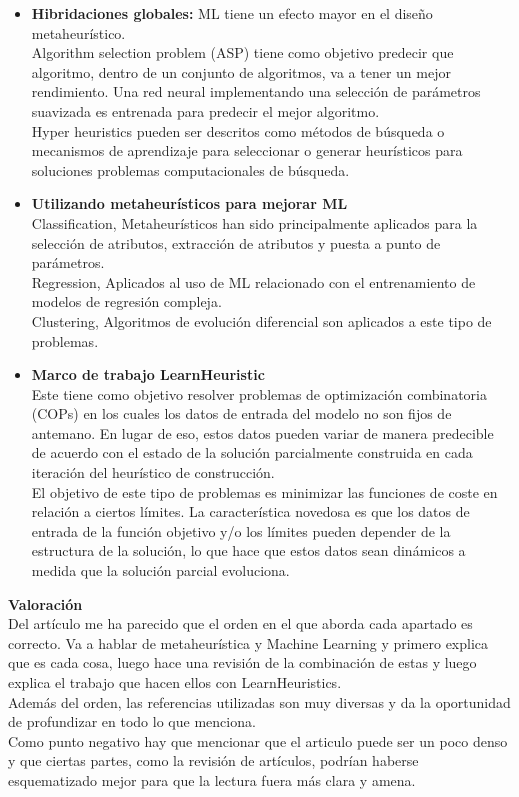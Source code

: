 \documentclass[11pt]{article} %
\begin{document}
\begin{itemize}
\item \textbf{Hibridaciones globales:} ML tiene un efecto mayor en el diseño metaheurístico.\\[0.2cm]
Algorithm selection problem (ASP)  tiene como objetivo predecir que algoritmo, dentro de un conjunto de algoritmos, va a tener un mejor rendimiento. Una red neural implementando una selección de parámetros suavizada es entrenada para predecir el mejor algoritmo.\\[0.2cm]
Hyper heuristics pueden ser descritos como métodos de búsqueda o mecanismos de aprendizaje para seleccionar o generar heurísticos para soluciones problemas computacionales de búsqueda. 
\item \textbf{Utilizando metaheurísticos para mejorar ML}\\[0.2cm]
Classification, Metaheurísticos han sido principalmente aplicados para la selección de atributos, extracción de atributos y puesta a punto de parámetros.\\[0.2cm]
Regression, Aplicados al uso de ML relacionado con el entrenamiento de modelos de regresión compleja. \\[0.2cm]
Clustering, Algoritmos de evolución diferencial son aplicados a este tipo de problemas. 
\item \textbf{Marco de trabajo LearnHeuristic}\\[0.2cm]
Este tiene como objetivo resolver problemas de optimización combinatoria (COPs) en los cuales los datos de entrada del modelo no son fijos de antemano. En lugar de eso, estos datos pueden variar de manera predecible de acuerdo con el estado de la solución parcialmente construida en cada iteración del heurístico de construcción. \\[0.2cm]
El objetivo de este tipo de problemas es minimizar las funciones de coste en relación a ciertos límites. La característica novedosa es que los datos de entrada de la función objetivo y/o los límites pueden depender de la estructura de la solución, lo que hace que estos datos sean dinámicos a medida que la solución parcial evoluciona.
\end{itemize}

\textbf{Valoración}\\[0.2cm]

Del artículo me ha parecido que el orden en el que aborda cada apartado es correcto. Va a hablar de metaheurística y Machine Learning y primero explica que es cada cosa, luego hace una revisión de la combinación de estas y luego explica el trabajo que hacen ellos con LearnHeuristics.\\[0.2cm]
Además del orden, las referencias utilizadas son muy diversas y da la oportunidad de profundizar en todo lo que menciona.\\[0.2cm]
Como punto negativo hay que mencionar que el articulo puede ser un poco denso y que ciertas partes, como la revisión de artículos, podrían haberse esquematizado mejor para que la lectura fuera más clara y amena.
\end{document}
